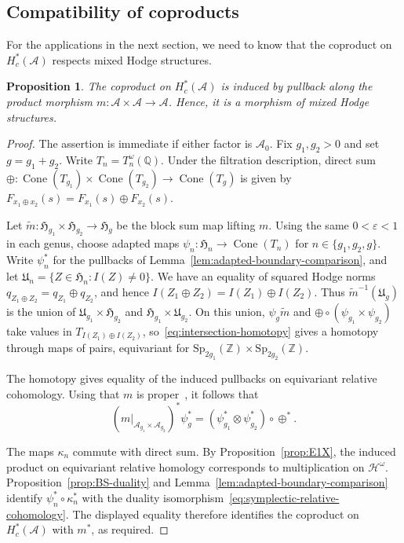 \documentclass[12 pt]{amsart}
\newcommand{\fH}{\mathfrak H}
\newcommand{\fU}{\mathfrak U}
\newcommand{\QQ}{\mathbb{Q}}
\newcommand{\ZZ}{\mathbb{Z}}
\newcommand{\cA}{\mathcal{A}}
\newcommand{\cH}{\mathcal{H}}
\newcommand{\Sp}{\mathrm{Sp}}
\newcommand{\Cone}{\operatorname{Cone}}
\newcommand{\<}{\langle}
\renewcommand{\>}{\rangle}
\newtheorem{proposition}[theorem]{Proposition}
\theoremstyle{definition}
\begin{document}
\subsection{Compatibility of coproducts}\label{sec:block-sums}

For the applications in the next section, we need to know that the coproduct on $H_c^*(\cA)$ respects mixed Hodge structures.

\begin{proposition}\label{prop:block-sums}
The coproduct on $H_c^*(\cA)$ is induced by pullback along the product morphism $m \colon \cA \times \cA \longrightarrow \cA$. Hence, it is a morphism of mixed Hodge structures.
\end{proposition}

\begin{proof}
The assertion is immediate if either factor is $\cA_0$. Fix $g_1, g_2 > 0$ and set $g = g_1 + g_2$. Write $T_n = T_n^\omega(\QQ)$. Under the filtration description, direct sum $\oplus \colon \Cone(T_{g_1}) \times \Cone(T_{g_2}) \to \Cone(T_g)$ is given by $F_{x_1 \oplus x_2}(s) = F_{x_1}(s) \oplus F_{x_2}(s)$.

Let $\widetilde m \colon \fH_{g_1} \times \fH_{g_2} \to \fH_g$ be the block sum map lifting $m$. Using the same $0 < \varepsilon < 1$ in each genus, choose adapted maps $\psi_n \colon \fH_n \to \Cone(T_n)$ for $n \in \{ g_1, g_2, g \}$. Write $\psi_n^*$ for the pullbacks of Lemma~\ref{lem:adapted-boundary-comparison}, and let $\fU_n = \{ Z \in \fH_n : I(Z) \neq 0 \}$. We have an equality of squared Hodge norms $q_{Z_1 \oplus Z_2} = q_{Z_1} \oplus q_{Z_2}$, and hence $I(Z_1 \oplus Z_2) = I(Z_1) \oplus I(Z_2)$. Thus $\widetilde m^{-1}(\fU_g)$ is the union of $\fU_{g_1} \times \fH_{g_2}$ and $\fH_{g_1} \times \fU_{g_2}$. On this union, $\psi_g \widetilde m$ and $\oplus \circ (\psi_{g_1} \times \psi_{g_2})$ take values in $T_{I(Z_1) \oplus I(Z_2)}$, so~\eqref{eq:intersection-homotopy} gives a homotopy through maps of pairs, equivariant for $\Sp_{2g_1}(\ZZ) \times \Sp_{2g_2}(\ZZ)$.

The homotopy gives equality of the induced pullbacks on equivariant relative cohomology. Using that $m$ is proper~\cite[Remark~4.2]{BCGP}, it follows that
\[
(m|_{\cA_{g_1} \times \cA_{g_2}})^* \psi_g^* = (\psi_{g_1}^* \otimes \psi_{g_2}^*) \circ \oplus^*.
\]

The maps $\kappa_n$ commute with direct sum. By Proposition~\ref{prop:E1X}, the induced product on equivariant relative homology corresponds to multiplication on $\cH^\omega$. Proposition~\ref{prop:BS-duality} and Lemma~\ref{lem:adapted-boundary-comparison} identify $\psi_n^* \circ \kappa_n^*$ with the duality isomorphism~\eqref{eq:symplectic-relative-cohomology}. The displayed equality therefore identifies the coproduct on $H_c^*(\cA)$ with $m^*$, as required.
\end{proof}
\end{document}
